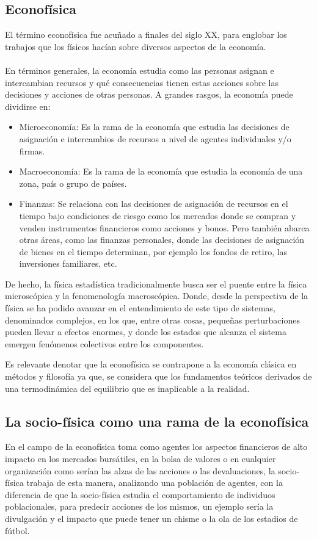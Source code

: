 \subsection*{Econofísica}
El término econofísica fue acuñado a finales del siglo XX, para englobar los trabajos que los físicos hacían sobre diversos aspectos de la economía.
\\
\\
En términos generales, la economía estudia como las personas asignan e intercambian recursos y qué consecuencias tienen estas acciones sobre las decisiones y acciones de otras personas. A grandes rasgos, la economía puede dividirse en:

\begin{itemize}
    \item Microeconomía: Es la rama de la economía que estudia las decisiones de asignación e intercambios de recursos a nivel de agentes individuales y/o firmas.
    \item Macroeconomía: Es la rama de la economía que estudia la economía de una zona, país o grupo de países.
    \item Finanzas: Se relaciona con las decisiones de asignación de recursos en el tiempo bajo condiciones de riesgo como los mercados donde se compran y venden instrumentos financieros como acciones y bonos. Pero también abarca otras áreas, como las finanzas personales, donde las decisiones de asignación de bienes en el tiempo determinan, por ejemplo los fondos de retiro, las inversiones familiares, etc.
\end{itemize}

De hecho, la física estadística tradicionalmente busca ser el puente entre la física microscópica y la fenomenología macroscópica. Donde, desde la perspectiva de la física se ha podido avanzar en el entendimiento de este tipo de sistemas, denominados complejos, en los que, entre otras cosas, pequeñas perturbaciones pueden llevar a efectos enormes, y donde los estados que alcanza el sistema emergen fenómenos colectivos entre los componentes. \cite{Rodriguez2021}

Es relevante denotar que la econofísica se contrapone a la economía clásica en métodos y filosofía ya que, se considera que los fundamentos teóricos derivados de una termodinámica del equilibrio que es inaplicable a la realidad.

\subsection*{La socio-física como una rama de la econofísica}
En el campo de la econofísica toma como agentes los aspectos financieros de alto impacto en los mercados bursátiles, en la bolsa de valores o en cualquier organización como serían las alzas de las acciones o las devaluaciones, la socio-física trabaja de esta manera, analizando una población de agentes, con la diferencia de que la socio-física estudia el comportamiento de individuos poblacionales, para predecir acciones de los mismos, un ejemplo sería la divulgación y el impacto que puede tener un chisme o la ola de los estadios de fútbol.\cite{Galam2008}
\thispagestyle{empty}	
